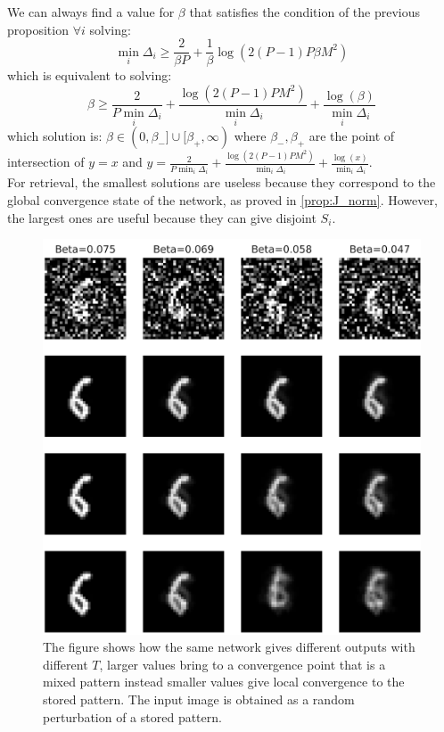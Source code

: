 \begin{remark}
	We can always find a value for $\beta$ that satisfies the condition of the previous proposition $\forall i$  solving:
	\[
	\min_i \Delta_i \geq \frac{2}{\beta P} + \frac{1}{\beta} \log(2(P-1)P \beta M^2)
	\]
	which is equivalent to solving:
	\[
	\beta \geq \frac{2}{P \min_i \Delta_i }+\frac{\log(2(P-1)P M^2)}{\min_i \Delta_i} +\frac{ \log(\beta)}{ \min_i \Delta_i}
	\]
	which solution is: $\beta \in (0,\beta_-] \cup [\beta_+,\infty)$ where $\beta_-,\beta_+$ are the point of \\intersection of $y=x$ and $y=\frac{2}{P \min_i \Delta_i }+\frac{\log(2(P-1)P M^2)}{\min_i \Delta_i} +\frac{ \log(x)}{ \min_i \Delta_i}$. \\
	For retrieval, the smallest solutions are useless because they correspond to the global convergence state of the network, as proved in \cref{prop:J_norm}. However, the largest ones are useful because they can give disjoint $S_i$.
\end{remark}

\begin{figure}[ht]
    \centering
    \includegraphics[width=0.6\linewidth]{Figures/FCHopfield.png}
    \caption{The figure shows how the same network gives different outputs with different $T$, larger values bring to a convergence point that is a mixed pattern instead smaller values give local convergence to the stored pattern. The input image is obtained as a random perturbation of a stored pattern.}
\end{figure}

